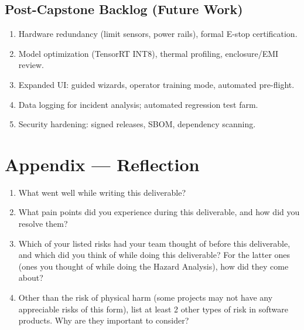 \documentclass{article}
\begin{document}
\subsection{Post-Capstone Backlog (Future Work)}
\begin{enumerate}
  \item Hardware redundancy (limit sensors, power rails), formal E-stop certification.
  \item Model optimization (TensorRT INT8), thermal profiling, enclosure/EMI review.
  \item Expanded UI: guided wizards, operator training mode, automated pre-flight.
  \item Data logging for incident analysis; automated regression test farm.
  \item Security hardening: signed releases, SBOM, dependency scanning.
\end{enumerate}
\newpage{}

\section*{Appendix --- Reflection}




\begin{enumerate}
  \item What went well while writing this deliverable?
  \item What pain points did you experience during this deliverable, and how did you
        resolve them?
  \item Which of your listed risks had your team thought of before this deliverable,
        and which did you think of while doing this deliverable? For the latter ones
        (ones you thought of while doing the Hazard Analysis), how did they come about?
  \item Other than the risk of physical harm (some projects may not have any
        appreciable risks of this form), list at least 2 other types of risk in
        software products. Why are they important to consider?
\end{enumerate}
\end{document}
